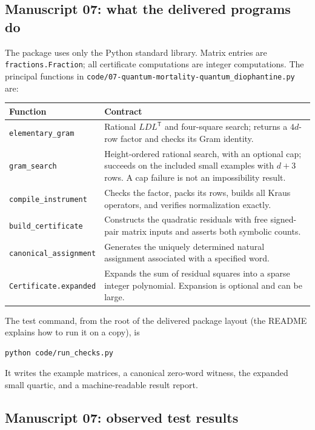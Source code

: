 \documentclass[11pt,letterpaper]{article}
\numberwithin{equation}{section}
\theoremstyle{definition}
\theoremstyle{remark}
\newcommand{\code}[1]{\nolinkurl{#1}}
\begin{document}
\subsection{Manuscript 07: what the delivered programs do}\label{pqc:qm:sec:implementation}

The package uses only the Python standard library. Matrix entries are \code{fractions.Fraction}; all certificate computations are integer computations. The principal functions in \code{code/07-quantum-mortality-quantum_diophantine.py} are:

\begin{center}
\begin{tabular}{@{}p{}p{}@{}}
\toprule
Function & Contract \\
\midrule
\code{elementary_gram} & Rational $LDL^{\mathsf T}$ and four-square search; returns a $4d$-row factor and checks its Gram identity. \\
\code{gram_search} & Height-ordered rational search, with an optional cap; succeeds on the included small examples with $d+3$ rows. A cap failure is not an impossibility result. \\
\code{compile_instrument} & Checks the factor, packs its rows, builds all Kraus operators, and verifies normalization exactly. \\
\code{build_certificate} & Constructs the quadratic residuals with free signed-pair matrix inputs and asserts both symbolic counts. \\
\code{canonical_assignment} & Generates the uniquely determined natural assignment associated with a specified word. \\
\code{Certificate.expanded} & Expands the sum of residual squares into a sparse integer polynomial. Expansion is optional and can be large. \\
\bottomrule
\end{tabular}
\end{center}

The test command, from the root of the delivered package layout (the README explains how to run it on a copy), is
\begin{lstlisting}
python code/run_checks.py
\end{lstlisting}
It writes the example matrices, a canonical zero-word witness, the expanded small quartic, and a machine-readable result report.

\subsection{Manuscript 07: observed test results}
\end{document}

